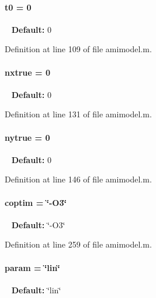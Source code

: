 \paragraph[{t0}]{\setlength{\rightskip}{0pt plus 5cm}t0 = 0}\label{classamimodel_abdb5a42ffee3ca622484b53a322f1004}
~\newline
{\bfseries Default\+:} 0 

Definition at line 109 of file amimodel.\+m.

\hypertarget{classamimodel_a49c476de14a021114feb8c95da04952a}{}
\paragraph[{nxtrue}]{\setlength{\rightskip}{0pt plus 5cm}nxtrue = 0}\label{classamimodel_a49c476de14a021114feb8c95da04952a}
~\newline
{\bfseries Default\+:} 0 

Definition at line 131 of file amimodel.\+m.

\hypertarget{classamimodel_ac91d7b36031ec122abc9f739692b02e8}{}
\paragraph[{nytrue}]{\setlength{\rightskip}{0pt plus 5cm}nytrue = 0}\label{classamimodel_ac91d7b36031ec122abc9f739692b02e8}
~\newline
{\bfseries Default\+:} 0 

Definition at line 146 of file amimodel.\+m.

\hypertarget{classamimodel_ad99abcd270ac97546c46292ebc6c2e0a}{}
\paragraph[{coptim}]{\setlength{\rightskip}{0pt plus 5cm}coptim = \char`\"{}-\/O3\char`\"{}}\label{classamimodel_ad99abcd270ac97546c46292ebc6c2e0a}
~\newline
{\bfseries Default\+:} \char`\"{}-\/\+O3\char`\"{} 

Definition at line 259 of file amimodel.\+m.

\hypertarget{classamimodel_a51f20d6b1b54a2eee3be0e8adc96a0ae}{}
\paragraph[{param}]{\setlength{\rightskip}{0pt plus 5cm}param = \char`\"{}lin\char`\"{}}\label{classamimodel_a51f20d6b1b54a2eee3be0e8adc96a0ae}
~\newline
{\bfseries Default\+:} \char`\"{}lin\char`\"{} 

